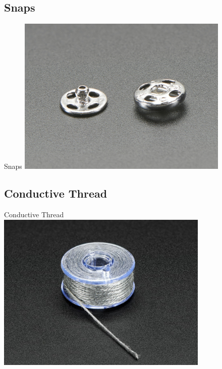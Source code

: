 \documentclass{beamer}
\begin{document}
\subsection{Snaps}
\begin{frame}[fragile]{Snaps}
\includegraphics[height=3in]{snap.jpg}
\end{frame}
\subsection{Conductive Thread}
\begin{frame}[fragile]{Conductive Thread}
\includegraphics[height=3in]{conductivethread.jpg}
\end{frame}
\end{document}
